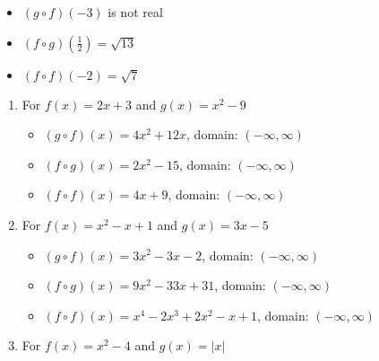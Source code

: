 \begin{enumerate}
\begin{multicols}{3}

\begin{itemize}

\item  $(g\circ f)(-3)$ is not real

\item  $(f\circ g)\left(\frac{1}{2}\right) = \sqrt{13}$

\item  $(f \circ f)(-2) = \sqrt{7}$

\end{itemize}

\end{multicols}
\setcounter{HW}{\value{enumi}}
\end{enumerate}

\begin{enumerate}
\setcounter{enumi}{\value{HW}}

\item For $f(x) = 2x+3$ and $g(x) = x^2-9$

\begin{itemize}

\item  $(g \circ f)(x) = 4x^2+12x$, domain: $(-\infty, \infty)$

\item  $(f \circ g)(x) = 2x^2-15$, domain: $(-\infty, \infty)$

\item  $(f \circ f)(x) = 4x+9$, domain: $(-\infty, \infty)$

\end{itemize}

\pagebreak

\item For  $f(x) = x^2 -x+1$ and $g(x) = 3x-5$ 

\begin{itemize}

\item  $(g \circ f)(x) = 3x^2-3x-2$, domain: $(-\infty, \infty)$

\item  $(f \circ g)(x) =9x^2-33x+31$, domain: $(-\infty, \infty)$

\item  $(f \circ f)(x) = x^4-2x^3+2x^2-x+1$, domain: $(-\infty, \infty)$

\end{itemize}

\item For  $f(x) = x^2-4$ and $g(x) = |x|$ 


\end{enumerate}
